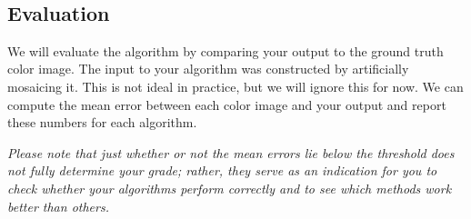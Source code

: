 \documentclass[11pt]{article}
\begin{document}
    \begin{center}
    \end{center}
    { \hspace*{\fill} \\}
    
    \subsection{Evaluation}\label{evaluation}

We will evaluate the algorithm by comparing your output to the ground
truth color image. The input to your algorithm was constructed by
artificially mosaicing it. This is not ideal in practice, but we will
ignore this for now. We can compute the mean error between each color
image and your output and report these numbers for each algorithm.

\emph{Please note that just whether or not the mean errors lie below the
threshold does not fully determine your grade; rather, they serve as an
indication for you to check whether your algorithms perform correctly
and to see which methods work better than others.}
\end{document}
